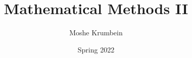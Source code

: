 
\usepackage{subfiles}

\title{Mathematical Methods II}
\def \thecoursenum {80157}
\def \theinstructor {Prof. Ruth Lawrence-Naimark}
\author{Moshe Krumbein}
\date{Spring 2022}





\setcounter{tocdepth}{2}
\tableofcontents
\cleardoublepage




